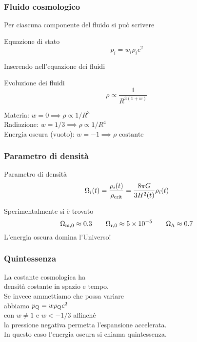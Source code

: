 \begin{frame}
  \frametitle{Fluido cosmologico}
  Per ciascuna componente del fluido si può scrivere
  \begin{block}{Equazione di stato}
    \begin{equation*}
      p_i = w_i \rho_i c^2
    \end{equation*}
  \end{block}
  \pause{}
  Inserendo nell'equazione dei fluidi
  \begin{block}{Evoluzione dei fluidi}
    \begin{equation*}
      \rho \propto \frac{1}{R^{3(1+w)}}
    \end{equation*}
  \end{block}
  \pause{}
  Materia: $w = 0 \implies \rho \propto 1/R^3$ \\
  \pause{}
  Radiazione: $w = 1/3 \implies \rho \propto 1/R^4$ \\
  \pause{}
  Energia oscura (vuoto): $w = -1 \implies \rho \text{ costante}$
\end{frame}

\begin{frame}
  \frametitle{Parametro di densità}
  \begin{block}{Parametro di densità}
    \begin{equation*}
      \Omega_i(t) = \frac{\rho_i(t)}{\rho_{\textup{crit}}} = \frac{8\pi
        G}{3H^2(t)}\rho_i(t)
    \end{equation*}
  \end{block}
  \pause{}
  Sperimentalmente si è trovato
  \begin{equation*}
    \Omega_{\textup{m},0} \approx \num{0.3} \qquad \Omega_{\textup{r},0} \approx
    \num{5e-5} \qquad \Omega_\Lambda \approx \num{0.7}
  \end{equation*}
  L'energia oscura domina l'Universo!
\end{frame}


\begin{frame}
  \frametitle{Quintessenza}
  La costante cosmologica ha \\
  densità costante in spazio e tempo. \\
  Se invece ammettiamo che possa variare \\
  abbiamo $p_{\textup{Q}} = w\rho_{\textup{Q}}c^2$ \\
  con $w \neq 1$ e $w < -1/3$ affinché \\
  la pressione negativa permetta l'espansione accelerata. \\
  In questo caso l'energia oscura si chiama \alert{quintessenza}.
\end{frame}

